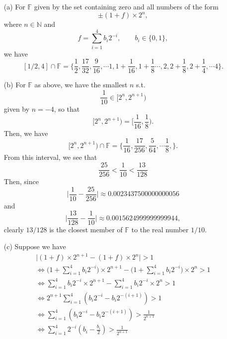 
\begin{itemize}
    \item[(a)]
        For $\mathbb{F}$ given by the set containing zero and all numbers
        of the form
        \[
           \pm (1 + f) \times 2^n, 
        \]
        where $n \in \mathbb{N}$ and
        \[
            f = \sum_{i=1}^4 b_i 2^{-i}, \qquad b_i \in \lbrace 0, 1 \rbrace,
        \]
        we have
        \[
            [1/2, 4] \cap \mathbb{F} = \biggl\lbrace \frac{1}{2}, \frac{17}{32}, 
            \frac{9}{16}, \dotsb
            1, 1 + \frac{1}{16}, 1 + \frac{1}{8} \dotsb, 2, 2 + \frac{1}{8},
            2 + \frac{1}{4}, \dotsb 4 \biggr\rbrace.
        \]
    \item[(b)]
        For $\mathbb{F}$ as above, we have the smallest $n$ s.t. 
        \[
            \frac{1}{10} \in [2^n, 2^{n+1})
        \]
        given by $n = -4$, so that
        \[
            [2^n, 2^{n+1}) = \biggl[\frac{1}{16}, \frac{1}{8}\biggr).
        \]
        Then, we have
        \[
            [2^n, 2^{n+1}) \cap \mathbb{F} = \biggl\lbrace \frac{1}{16}, 
            \frac{17}{256}, \frac{5}{64}, \dotsb \frac{1}{8}, \biggr\rbrace.
        \]
        From this interval, we see that
        \[
            \frac{25}{256} < \frac{1}{10} < \frac{13}{128}
        \]
        Then, since 
        \[
            \biggl\lvert \frac{1}{10} - \frac{25}{256} \biggr\rvert \approx 
            0.0023437500000000056
        \]
        and
        \[
            \biggl\lvert \frac{13}{128} - \frac{1}{10} \biggr\rvert \approx 
            0.0015624999999999944,
        \]
        clearly $13/128$ is the closest member of $\mathbb{F}$ to the real number 
        $1/10$.
    \item[(c)]
        Suppose we have 
        \begin{equation*}
            \begin{split}
                \lvert (1 + f) \times 2^{n+1} - (1 + f) \times 2^n \rvert > 1 \\
                \Leftrightarrow \biggl(1 + \sum_{i=1}^4 b_i 2^{-i}\biggr)
                \times 2^{n+1} 
                - \biggl(1 + \sum_{i=1}^4 b_i 2^{-i}\biggr) \times 2^n > 1 \\
                \Leftrightarrow \sum_{i=1}^4 b_i 2^{-i}\times 2^{n+1} 
                - \sum_{i=1}^4 b_i 2^{-i} \times 2^n > 1 \\
                \Leftrightarrow 2^{n+1}\sum_{i=1}^4 \left(b_i 2^{-i} 
                - b_i 2^{-(i+1)}\right) > 1 \\
                \Leftrightarrow \sum_{i=1}^4 \left(b_i 2^{-i} 
                - b_i 2^{-(i+1)}\right) > \frac{1}{2^{n+1}} \\
                \Leftrightarrow \sum_{i=1}^4 2^{-i} \left(b_i - \frac{b_i}{2}\right) 
                > \frac{1}{2^{n+1}} \\
            \end{split}
        \end{equation*}
\end{itemize}
